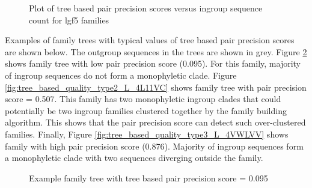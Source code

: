 \documentclass{article}
\begin{document}
		\begin{figure}[h!]
			\caption{Plot of tree based pair precision scores versus ingroup sequence count for lgf5 families}
			\label{fig:scatter_tree_precision_vs_seqct_lgf5}
		\end{figure}
		
		Examples of family trees with typical values of tree based pair precision scores are shown below. The outgroup sequences in the trees are shown in grey. Figure \ref{fig:tree_based_quality_type1_L_J5W12Z} shows family tree with low pair precision score (0.095). For this family, majority of ingroup sequences do not form a monophyletic clade. Figure \ref{fig:tree_based_quality_type2_L_4L11VC} shows family tree with pair precision score = 0.507. This family has two monophyletic ingroup clades that could potentially be two ingroup families clustered together by the family building algorithm. This shows that the pair precision score can detect such over-clustered families. Finally, Figure  \ref{fig:tree_based_quality_type3_L_4VWLVV} shows family with high pair precision score (0.876). Majority of ingroup  sequences form a monophyletic clade with two sequences diverging outside the family.
		
			
		\begin{figure}[h!]
			\caption{Example family tree with tree based pair precision score = 0.095}
			\label{fig:tree_based_quality_type1_L_J5W12Z}
		\end{figure}
		
\end{document}
